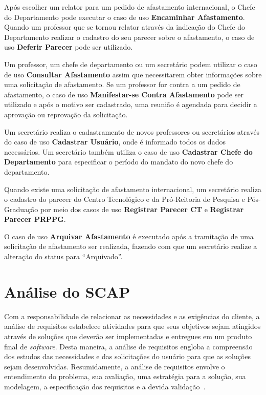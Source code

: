 Após escolher um relator para um pedido de afastamento internacional, o Chefe do Departamento pode executar o caso de uso \textbf{Encaminhar Afastamento}. Quando um professor que se tornou relator através da indicação do Chefe do Departamento realizar o cadastro do seu parecer sobre o afastamento, o caso de uso \textbf{Deferir Parecer} pode ser utilizado.

Um professor, um chefe de departamento ou um secretário podem utilizar o caso de uso \textbf{Consultar Afastamento} assim que necessitarem obter informações sobre uma solicitação de afastamento. Se um professor for contra a um pedido de afastamento, o caso de uso \textbf{Manifestar-se Contra Afastamento} pode ser utilizado e após o motivo ser cadastrado, uma reunião é agendada para decidir a aprovação ou reprovação da solicitação.

Um secretário realiza o cadastramento de novos professores ou secretários através do caso de uso \textbf{Cadastrar Usuário}, onde é informado todos os dados necessários. Um secretário também utiliza o caso de uso \textbf{Cadastrar Chefe do Departamento} para especificar o período do mandato do novo chefe do departamento.
  
Quando existe uma solicitação de afastamento internacional, um secretário realiza o cadastro do parecer do Centro Tecnológico e da Pró-Reitoria de Pesquisa e Pós-Graduação por meio dos casos de uso \textbf{Registrar Parecer CT} e \textbf{Registrar Parecer PRPPG}.

O caso de uso \textbf{Arquivar Afastamento} é executado após a tramitação de uma solicitação de afastamento ser realizada, fazendo com que um secretário realize a alteração do status para ``Arquivado''.   

\section{Análise do SCAP}
\label{sec-requisitos-analise-scap}

Com a responsabilidade de relacionar as necessidades e as exigências do cliente, a análise de requisitos estabelece atividades para que seus objetivos sejam atingidos através de soluções que deverão ser implementadas e entregues em um produto final de \textit{software}. Desta maneira, a análise de requisitos engloba a compreensão dos estudos das necessidades e das solicitações do usuário para que as soluções sejam desenvolvidas. Resumidamente, a análise de requisitos envolve o entendimento do problema, sua avaliação, uma estratégia para a solução, sua modelagem, a especificação dos requisitos e a devida validação~\cite{amui:pds15}.


